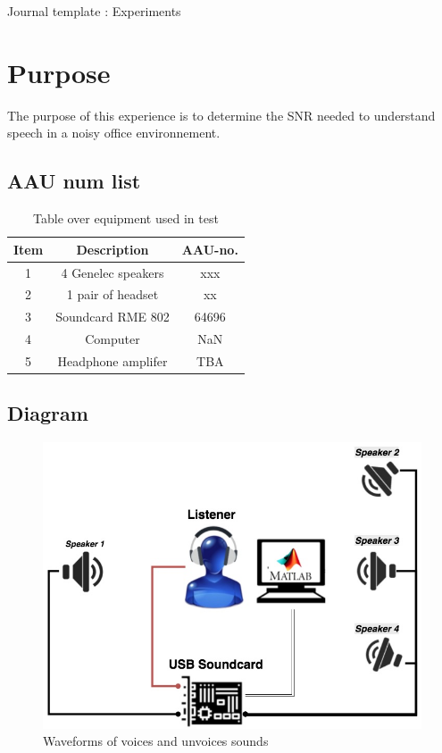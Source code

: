 \documentclass[12pt,a4paper]{article}
\begin{document}
\begin{Huge}
\begin{center}
Journal template : Experiments
\end{center}
\end{Huge}


\section{Purpose}

The purpose of this experience is to determine the SNR needed to understand speech in a noisy office environnement.

\subsection{AAU num list}

\begin{table}[h]
	\centering
	
	\begin{tabular}{ c c c } \toprule
		{Item} & {Description} & {AAU-no}. \\ \bottomrule 
		1      &  4 Genelec speakers					& xxx	\\
		2      &  1 pair of headset						& xx		\\
		3      &  Soundcard RME 802                    	& 64696		\\
		4      &  Computer								& NaN		\\  
		5      &  Headphone amplifer    				& TBA		\\ \bottomrule 
	\end{tabular}
	\caption{Table over equipment used in test}
	\label{tab:UsedEquipmentListning1}
\end{table}



\subsection{Diagram}

\begin{figure}[H]
	\label{fig1}
	\centering
		\includegraphics[width=12cm]{setup}
		\caption{Waveforms of voices and unvoices sounds}
	\end{figure}
\end{document}
